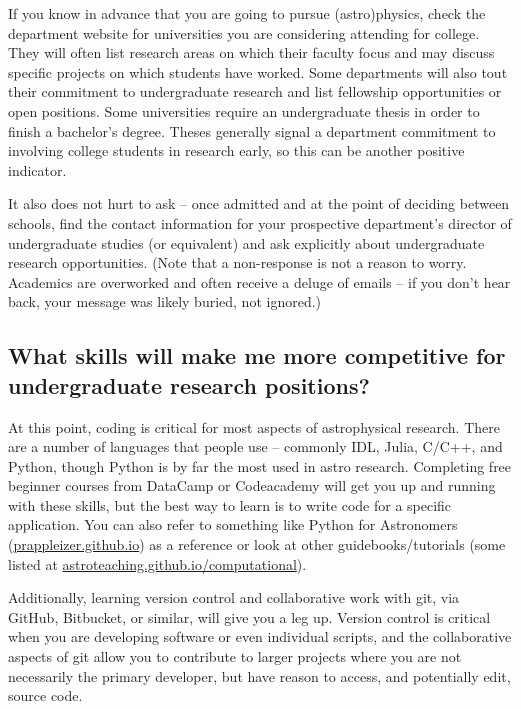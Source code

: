 If you know in advance that you are going to pursue (astro)physics, check the department website for universities you are considering attending for college. They will often list research areas on which their faculty focus and may discuss specific projects on which students have worked. Some departments will also tout their commitment to undergraduate research and list fellowship opportunities or open positions. Some universities require an undergraduate thesis in order to finish a bachelor's degree. Theses generally signal a department commitment to involving college students in research early, so this can be another positive indicator.

It also does not hurt to ask -- once admitted and at the point of deciding between schools, find the contact information for your prospective department's director of undergraduate studies (or equivalent) and ask explicitly about undergraduate research opportunities. (Note that a non-response is not a reason to worry. Academics are overworked and often receive a deluge of emails -- if you don't hear back, your message was likely buried, not ignored.)

\subsection{What skills will make me more competitive for undergraduate research positions?}

At this point, coding is critical for most aspects of astrophysical research. There are a number of languages that people use -- commonly IDL, Julia, C/C++, and Python, though Python is by far the most used in astro research. Completing free beginner courses from DataCamp or Codeacademy will get you up and running with these skills, but the best way to learn is to write code for a specific application. You can also refer to something like Python for Astronomers (\href{https://prappleizer.github.io/}{prappleizer.github.io}) as a reference or look at other guidebooks/tutorials (some listed at \href{https://astroteaching.github.io/computational/}{astroteaching.github.io/computational}).

Additionally, learning version control and collaborative work with git, via GitHub, Bitbucket, or similar, will give you a leg up. Version control is critical when you are developing software or even individual scripts, and the collaborative aspects of git allow you to contribute to larger projects where you are not necessarily the primary developer, but have reason to access, and potentially edit, source code.


